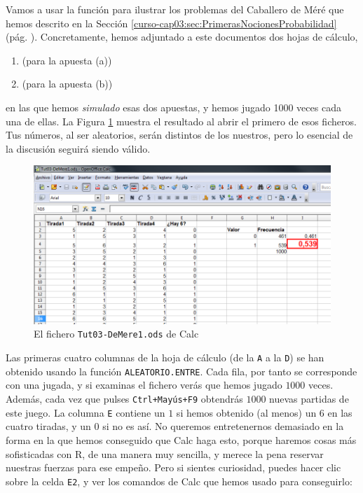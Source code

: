 \documentclass[10pt,a4paper]{article}\usepackage[]{graphicx}\usepackage[]{color}
\newcounter {cont01}
\begin{document}
Vamos a usar la función para ilustrar los problemas del Caballero de Méré que hemos descrito en la Sección \ref{curso-cap03:sec:PrimerasNocionesProbabilidad} (pág. \pageref{curso-cap03:sec:PrimerasNocionesProbabilidad}). Concretamente, hemos adjuntado a este documentos dos hojas de cálculo,
\begin{center}
  \begin{enumerate}
    \item {} (para la apuesta (a))
    \item {} (para la apuesta (b))
  \end{enumerate}
\end{center}
en las que hemos {\em simulado} esas dos apuestas, y hemos jugado 1000 veces cada una de ellas. La Figura \ref{tut03:fig:Tut03-DeMere1.ods} muestra el resultado al abrir el primero de esos ficheros. Tus números, al ser aleatorios, serán distintos de los nuestros, pero lo esencial de la discusión seguirá siendo válido.
\begin{figure}[h!]
    \begin{center}
    \includegraphics[width=15cm]{../fig/Tut03-41.png}
    \end{center}
  \caption{El fichero {\tt Tut03-DeMere1.ods} de Calc}
  \label{tut03:fig:Tut03-DeMere1.ods}
\end{figure}
Las primeras cuatro columnas de la hoja de cálculo (de la {\tt A} a la {\tt D}) se han obtenido usando la función {\tt ALEATORIO.ENTRE}. Cada fila, por tanto se corresponde con una jugada, y si examinas el fichero verás que hemos jugado $1000$ veces.  Además, cada vez que pulses {\tt Ctrl+Mayús+F9} obtendrás $1000$ nuevas partidas de este juego. La columna {\tt E} contiene
un $1$ si hemos obtenido (al menos) un $6$ en las cuatro tiradas, y un $0$ si no es así. No queremos entretenernos demasiado en la forma en la que hemos conseguido que Calc haga esto, porque haremos cosas más  sofisticadas con R, de una manera muy sencilla, y merece la pena reservar nuestras fuerzas para ese empeño. Pero si sientes curiosidad, puedes hacer clic sobre la celda {\tt E2}, y ver los comandos de Calc que hemos usado para conseguirlo:
\end{document}
